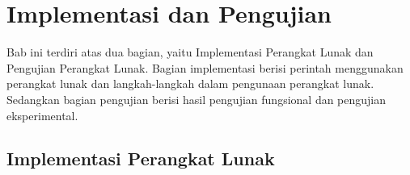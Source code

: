 \chapter{Implementasi dan Pengujian}
\label{sec: Implementasi dan Pengujian}

Bab ini terdiri atas dua bagian, yaitu Implementasi Perangkat Lunak dan Pengujian Perangkat Lunak. Bagian implementasi berisi perintah menggunakan perangkat lunak dan langkah-langkah dalam pengunaan perangkat lunak. Sedangkan bagian pengujian berisi hasil pengujian fungsional dan pengujian eksperimental.
\section{Implementasi Perangkat Lunak}
\label{sec: Implementasi Perangkat Lunak}

